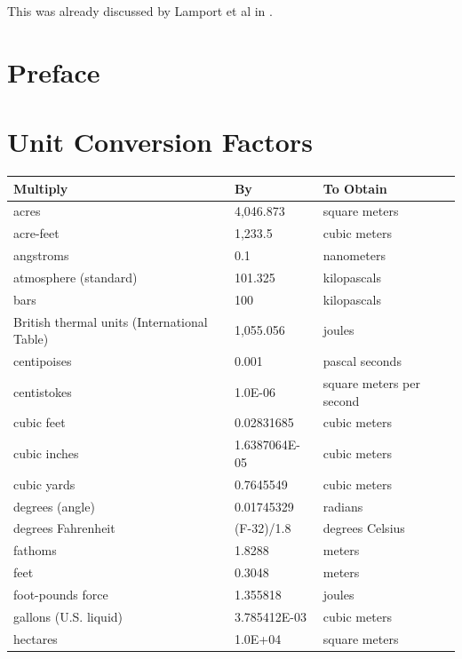 \documentclass{template/openetcs_report}
\begin{document}
This was already discussed by Lamport et al in \cite{lamport94}.





\chapter{Preface}
\lipsum[1-5]

\chapter{Unit Conversion Factors}

{\footnotesize\sffamily\centering
  \begin{longtable}{||l|l|l||}
    \hline\hline
    \bfseries Multiply & \bfseries By & \bfseries To Obtain\\
    \hline\hline
    \endhead
    \hline\hline
    \endfoot
    acres & 4,046.873 & square meters\\
    \hline
    acre-feet & 1,233.5 & cubic meters\\
    \hline
    angstroms & 0.1 & nanometers\\
    \hline
    atmosphere (standard) & 101.325 & kilopascals\\
    \hline
    bars & 100 & kilopascals\\
    \hline
    British thermal units (International Table) & 1,055.056 & joules\\
    \hline
    centipoises & 0.001 & pascal seconds\\
    \hline
    centistokes & 1.0E-06 & square meters per second\\
    \hline
    cubic feet & 0.02831685 & cubic meters\\
    \hline
    cubic inches & 1.6387064E-05 & cubic meters\\
    \hline
    cubic yards & 0.7645549 & cubic meters\\
    \hline
    degrees (angle) & 0.01745329 & radians\\
    \hline
    degrees Fahrenheit & (F-32)/1.8 & degrees Celsius\\
    \hline
    fathoms & 1.8288 & meters\\
    \hline
    feet & 0.3048 & meters\\
    \hline
    foot-pounds force & 1.355818 & joules\\
    \hline
    gallons (U.S. liquid) & 3.785412E-03 & cubic meters\\
    \hline
    hectares & 1.0E+04 & square meters\\

\end{longtable}}
\end{document}
